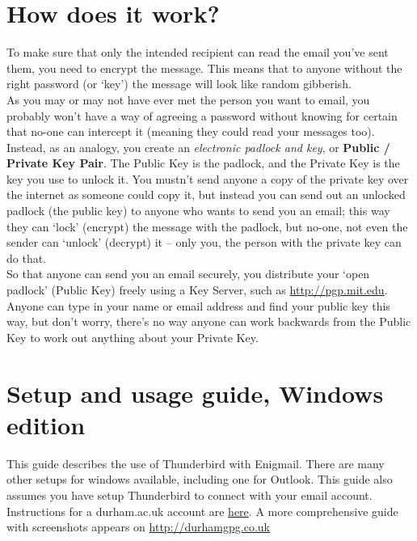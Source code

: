 \section{How does it work?}
To make sure that only the intended recipient can read the email you've sent them, you need to encrypt the message. This means that to anyone without the right password (or `key') the message will look like random gibberish. \\As you may or may not have ever met the person you want to email, you probably won't have a way of agreeing a password without knowing for certain that no-one can intercept it (meaning they could read your messages too). Instead, as an analogy, you create an \textit{electronic padlock and key}, or \textbf{Public / Private Key Pair}. The Public Key is the padlock, and the Private Key is the key you use to unlock it. You mustn't send anyone a copy of the private key over the internet as someone could copy it, but instead you can send out an unlocked padlock (the public key) to anyone who wants to send you an email; this way they can `lock' (encrypt) the message with the padlock, but no-one, not even the sender can `unlock' (decrypt) it -- only you, the person with the private key can do that.\\ So that anyone can send you an email securely, you distribute your `open padlock' (Public Key) freely using a Key Server, such as \href{http://pgp.mit.edu}{http://pgp.mit.edu}. Anyone can type in your name or email address and find your public key this way, but don't worry, there's no way anyone can work backwards from the Public Key to work out anything about your Private Key.

\section{Setup and usage guide, Windows edition}

This guide describes the use of Thunderbird with Enigmail. There are many other setups for windows available, including one for Outlook. This guide also assumes you have setup Thunderbird to connect with your email account. Instructions for a durham.ac.uk account are \href{http://www.dur.ac.uk/cis/email/exchange/eximap/configuring-clients/}{here}. A more comprehensive guide with screenshots appears on \href{http://durhamgpg.co.uk}{http://durhamgpg.co.uk}

